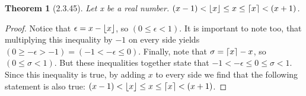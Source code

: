 \documentclass[a4paper, 12pt]{article}
\theoremstyle{plain}
\newtheorem*{theorem*}{Theorem}
\DeclarePairedDelimiter{\floor}{\lfloor}{\rfloor}
\DeclarePairedDelimiter{\ceil}{\lceil}{\rceil}
\begin{document}
	
	\begin{theorem*}[2.3.45]
		Let x be a real number. \newline $(x - 1) < \floor{x} \le x \le \ceil{x} < (x + 1)$.
	\end{theorem*}
	
	\begin{proof}
		Notice that $\epsilon = x - \floor{x}$, so $(0 \le \epsilon < 1)$. It is important to note 
		too, that multiplying this inequality by $-1$ on every side yields 
		$(0 \ge -\epsilon > -1) = (-1 < -\epsilon \le 0)$. Finally, note that 
		$\sigma = \ceil{x} - x$, so $(0 \le \sigma < 1)$. But these inequalities together state 
		that $-1 < -\epsilon \le 0 \le \sigma < 1$. Since this inequality is true, by adding $x$ to 
		every side we find that the following statement is also true: 
		$(x - 1) < \floor{x} \le x \le \ceil{x} < (x + 1)$.
	\end{proof}
\end{document}
